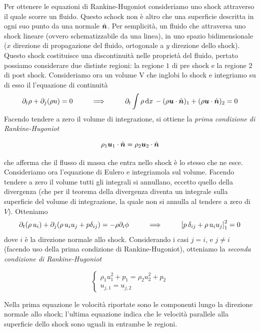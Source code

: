 Per ottenere le equazioni di Rankine-Hugoniot consideriamo uno shock attraverso il quale scorre un fluido. Questo schock non è altro che una superficie descritta in ogni suo punto da una normale $\V{\hat{n}}$. 
Per semplicità, un fluido che attraversa uno shock lineare (ovvero schematizzabile da una linea), in uno spazio bidimensionale ($x$ direzione di propagazione del fluido, ortogonale a $y$ direzione dello shock). Questo shock costituisce una discontinuità nelle proprietà del fluido, pertato possiamo considerare due distinte regioni: la regione $1$ di pre shock e la regione $2$ di post shock. Consideriamo ora un volume V che inglobi lo shock e integriamo su di esso il l'equazione di continuità
\begin{align*}
\dpt\rho + \dpj (\rho u) =0 \,\,\,\,\,\,\,\,\,\,\,\,\,\,\,\, \Longrightarrow \,\,\,\,\,\,\,\,\,\,\,\,\,\,\,\, \dpt \int \rho \,\dd x \, - (\rho \scal{u}{\hat{n}} )_1 + (\rho \scal{u}{\hat{n}} )_2 =0
\end{align*}
Facendo tendere a zero il volume di integrazione, si ottiene la \textit{prima condizione di Rankine-Hugoniot} 
\begin{EQ}
\begin{equation}
\rho_1 \V{u}_1 \cdot \V{\hat{n}} = \rho_2 \V{u}_2 \cdot \V{\hat{n}}
\end{equation}
\end{EQ}
che afferma che il flusso di massa che entra nello shock è lo stesso che ne esce.
Consideriamo ora l'equazione di Eulero e integriamola sul volume. Facendo tendere a zero il volume tutti gli integrali si annullano, eccetto quello della divergenza (che per il teorema della divergenza diventa un integrale sulla superficie del volume di integrazione, la quale non si annulla al tendere a zero di $V$). Otteniamo
\begin{equation}
\partial_t (\rho \, u_i) + \partial_j (\rho \,u_i u_j + p \delta_{ij}) = - \rho \partial_i \phi \,\,\,\,\,\,\,\,\,\,\,\,\,\,\,\, \Longrightarrow \,\,\,\,\,\,\,\,\,\,\,\,\,\,\,\, \left[ p \, \delta_{ij} + \rho \,u_i u_j \right]_1^2 = 0
\end{equation}
dove $i$ è la direzione normale allo shock. Considerando i casi $j=i$, e $j\neq i$ (facendo uso della prima condizione di Rankine-Hugoniot), otteniamo la \textit{seconda condizione di Rankine-Hugoniot}
\begin{EQ}
\begin{equation}
\begin{cases}
\rho_1 u_1^2 + p_1 = \rho_2 u_2^2 + p_2 \\
u_{j,1} = u_{j,2}
\end{cases}
\end{equation}
\end{EQ}
Nella prima equazione le volocità riportate sono le componenti lungo la direzione normale allo shock; l'ultima equazione indica che le velocità parallele alla superficie dello shock sono uguali in entrambe le regioni.

